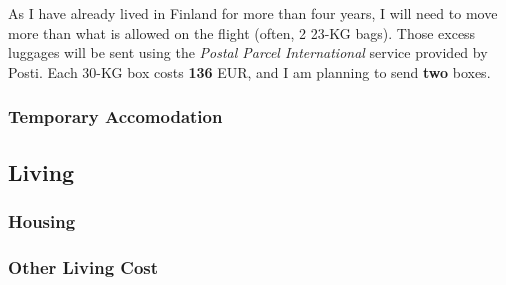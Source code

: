 \documentclass[11pt, oneside]{essay}
\begin{document}
As I have already lived in Finland for more than four years,
I will need to move more than what is allowed on the flight
(often, 2 23-KG bags). Those excess luggages will be sent using
the \textit{Postal Parcel International} service provided by
Posti. Each 30-KG box costs \textbf{136} EUR, and I am planning
to send \textbf{two} boxes.

\subsubsection{Temporary Accomodation}




\subsection{Living}

\subsubsection{Housing}


\subsubsection{Other Living Cost}








%
%
\end{document}
